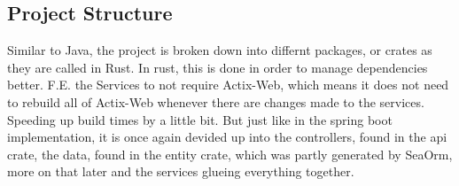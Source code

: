 \documentclass[a4paper,12pt]{article}
\begin{document}
	\subsection{Project Structure}
	\label{subsec:project_structure_rust}
	\begin{minipage}{0.4\textwidth}
	\clearpage
	\end{minipage}%
	\begin{minipage}{0.6\textwidth}
		Similar to Java, the project is broken down into differnt packages, or crates as they are called
		in Rust. In rust, this is done in order to manage dependencies better. F.E. the Services to not
		require Actix-Web, which means it does not need to rebuild all of Actix-Web whenever there are
		changes made to the services. Speeding up build times by a little bit. But just like in the 
		spring boot implementation, it is once again devided up into the controllers, found in the api
		crate, the data, found in the entity crate, which was partly generated by SeaOrm, more on that
		later and the services glueing everything together.
	\end{minipage}%
\end{document}
